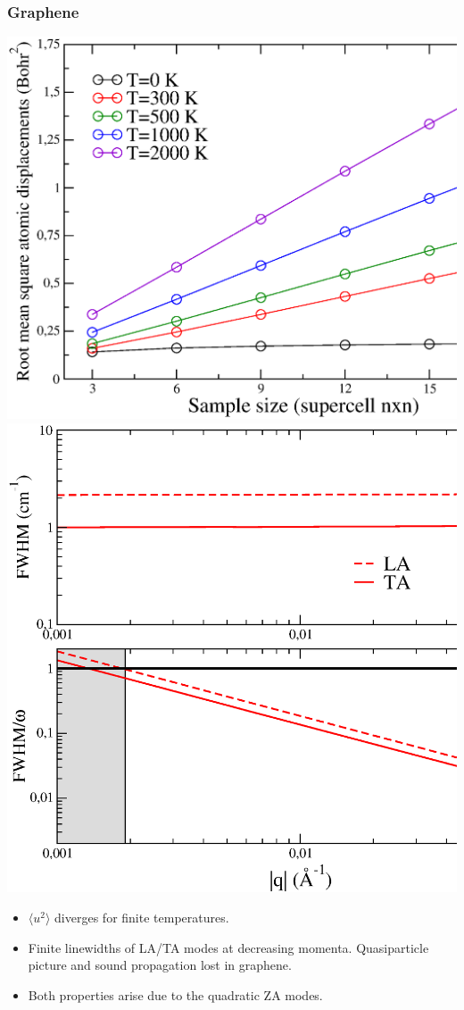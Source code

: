 \documentclass{beamer}
\begin{document}
\begin{frame}

 \frametitle{Graphene}
  \begin{center}
  \includegraphics[width=0.49\linewidth]{Pictures/Graphene/rms-harmonic.eps}
  \includegraphics[width=0.49\linewidth]{Pictures/Graphene/lw-graphene-harmonic.eps}
 \end{center}
 \begin{itemize}
  \item $\langle u^{2}\rangle$ diverges for finite temperatures.
  \item Finite linewidths of LA/TA modes at decreasing momenta. Quasiparticle picture and sound propagation lost 
	  in graphene.
  \item Both properties arise due to the quadratic ZA modes.
 \end{itemize}

\end{frame}

\end{document}
